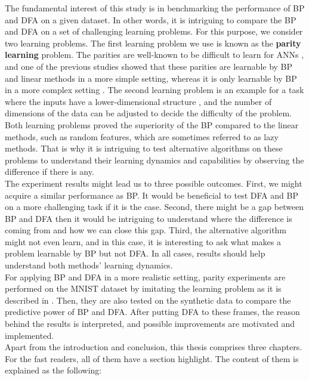 \documentclass[a4paper, nobind]{templates/ociamthesis}
\begin{document}
The fundamental interest of this study is in benchmarking the performance of BP and DFA on a given dataset. In other words, it is intriguing to compare the BP and DFA on a set of challenging learning problems. For this purpose, we consider two learning problems. The first learning problem we use is known as the \textbf{parity learning} problem. The parities are well-known to be difficult to learn for ANNs \cite{DBLP:journals/corr/abs-1807-06399}, and one of the previous studies showed that these parities are learnable by BP and linear methods in a more simple setting, whereas it is only learnable by BP in a more complex setting \cite{DBLP:journals/corr/abs-2002-07400}. The second learning problem is an example for a task where the inputs have a lower-dimensional structure \cite{chizat2020implicit}, and the number of dimensions of the data can be adjusted to decide the difficulty of the problem. Both learning problems proved the superiority of the BP compared to the linear methods, such as random features, which are sometimes referred to as lazy methods. That is why it is intriguing to test alternative algorithms on these problems to understand their learning dynamics and capabilities by observing the difference if there is any.\\
The experiment results might lead us to three possible outcomes. First, we might acquire a similar performance as BP. It would be beneficial to test DFA and BP on a more challenging task if it is the case. Second, there might be a gap between BP and DFA then it would be intriguing to understand where the difference is coming from and how we can close this gap. Third, the alternative algorithm might not even learn, and in this case, it is interesting to ask what makes a problem learnable by BP but not DFA. In all cases, results should help understand both methods' learning dynamics.\\
For applying BP and DFA in a more realistic setting, parity experiments are performed on the MNIST dataset by imitating the learning problem as it is described in \cite{DBLP:journals/corr/abs-2002-07400}. Then, they are also tested on the synthetic data to compare the predictive power of BP and DFA. After putting DFA to these frames, the reason behind the results is interpreted, and possible improvements are motivated and implemented.\\
Apart from the introduction and conclusion, this thesis comprises three chapters. For the fast readers, all of them have a section highlight. The content of them is explained as the following:\\
\end{document}
